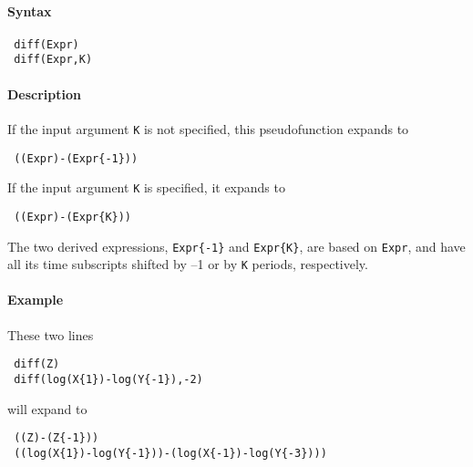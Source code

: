 


	\paragraph{Syntax}
 
 \begin{verbatim}
 diff(Expr)
 diff(Expr,K)
 \end{verbatim}
 
 \paragraph{Description}
 
 If the input argument \texttt{K} is not specified, this pseudofunction
 expands to
 
 \begin{verbatim}
 ((Expr)-(Expr{-1}))
 \end{verbatim}
 
 If the input argument \texttt{K} is specified, it expands to
 
 \begin{verbatim}
 ((Expr)-(Expr{K}))
 \end{verbatim}
 
 The two derived expressions, \texttt{Expr\{-1\}} and \texttt{Expr\{K\}},
 are based on \texttt{Expr}, and have all its time subscripts shifted by
 --1 or by \texttt{K} periods, respectively.
 
 \paragraph{Example}
 
 These two lines
 
 \begin{verbatim}
 diff(Z)
 diff(log(X{1})-log(Y{-1}),-2)
 \end{verbatim}
 
 will expand to
 
 \begin{verbatim}
 ((Z)-(Z{-1}))
 ((log(X{1})-log(Y{-1}))-(log(X{-1})-log(Y{-3})))
 \end{verbatim}


